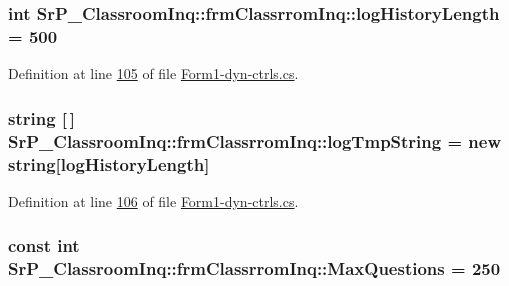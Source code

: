 \hypertarget{class_sr_p___classroom_inq_1_1frm_classrrom_inq_a0b55eb955abb243808249457ac92ca93}{
\subsubsection[{log\-History\-Length}]{\setlength{\rightskip}{0pt plus 5cm}int {\bf \-Sr\-P\-\_\-\-Classroom\-Inq\-::frm\-Classrrom\-Inq\-::log\-History\-Length} = 500}}
\label{class_sr_p___classroom_inq_1_1frm_classrrom_inq_a0b55eb955abb243808249457ac92ca93}


\-Definition at line \hyperlink{_form1-dyn-ctrls_8cs_source_l00105}{105} of file \hyperlink{_form1-dyn-ctrls_8cs_source}{\-Form1-\/dyn-\/ctrls.\-cs}.

\hypertarget{class_sr_p___classroom_inq_1_1frm_classrrom_inq_acf11c4997f1ad160ca28e4d7b1489f08}{
\subsubsection[{log\-Tmp\-String}]{\setlength{\rightskip}{0pt plus 5cm}string \mbox{[}$\,$\mbox{]} {\bf \-Sr\-P\-\_\-\-Classroom\-Inq\-::frm\-Classrrom\-Inq\-::log\-Tmp\-String} = new string\mbox{[}{\bf log\-History\-Length}\mbox{]}}}
\label{class_sr_p___classroom_inq_1_1frm_classrrom_inq_acf11c4997f1ad160ca28e4d7b1489f08}


\-Definition at line \hyperlink{_form1-dyn-ctrls_8cs_source_l00106}{106} of file \hyperlink{_form1-dyn-ctrls_8cs_source}{\-Form1-\/dyn-\/ctrls.\-cs}.

\hypertarget{class_sr_p___classroom_inq_1_1frm_classrrom_inq_abbcb6a4a2ba214bc7aab16386f0e8c98}{
\subsubsection[{\-Max\-Questions}]{\setlength{\rightskip}{0pt plus 5cm}const int {\bf \-Sr\-P\-\_\-\-Classroom\-Inq\-::frm\-Classrrom\-Inq\-::\-Max\-Questions} = 250}}
\label{class_sr_p___classroom_inq_1_1frm_classrrom_inq_abbcb6a4a2ba214bc7aab16386f0e8c98}



